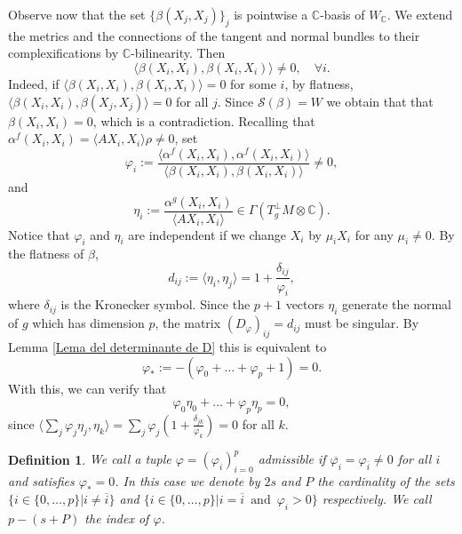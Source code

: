 \documentclass{article}
\newtheorem{defn}[thm]{Definition}
\theoremstyle{remark}
\begin{document}
Observe now that the set $\{\beta(X_j,X_j)\}_j$ is pointwise a $\mathbb{C}$-basis of $W_\mathbb{C}$. We extend the metrics and the connections of the tangent and normal bundles to their complexifications by $\mathbb{C}$-bilinearity. Then
\begin{equation*}\label{beta(i,i)neq 0}
    \langle\beta(X_i,X_i),\beta(X_i,X_i)\rangle \neq 0,\quad\forall i.
\end{equation*}
Indeed, if $\langle\beta(X_i,X_i),\beta(X_i,X_i)\rangle=0$ for some $i$, by flatness, $\langle\beta(X_i,X_i),\beta(X_j,X_j)\rangle=0$ for all $j$. Since $\mathcal{S}(\beta)=W$ we obtain that that $\beta(X_i,X_i)=0$, which is a contradiction.
Recalling that $\alpha^f(X_i,X_i)=\langle AX_i,X_i\rangle\rho\neq 0$, set
\begin{equation}\label{definion de tau_i}
    \varphi_i:=\frac{\langle\alpha^f(X_i,X_i),\alpha^f(X_i,X_i)\rangle}{\langle \beta(X_i,X_i),\beta(X_i,X_i)\rangle}\neq 0,
\end{equation}
and 
\begin{equation}\label{eta_i}
    \eta_i:=\frac{\alpha^g(X_i,X_i)}{\langle AX_i,X_i\rangle}\in\Gamma(T^\perp_g M\otimes\mathbb{C}).
\end{equation}
Notice that $\varphi_i$ and $\eta_i$ are independent if we change $X_i$ by $\mu_i X_i$ for any $\mu_i\neq 0$. By the flatness of $\beta$, 
\begin{equation}\label{d_ij definicion}
    d_{ij}:=\langle\eta_i,\eta_j\rangle=1+\frac{\delta_{ij}}{\varphi_i},
\end{equation}
where $\delta_{ij}$ is the Kronecker symbol. Since the $p+1$ vectors $\eta_i$ generate the normal of $g$ which has dimension $p$, the matrix $(D_\varphi)_{ij}=d_{ij}$ must be singular. By Lemma \ref{Lema del determinante de D} this is equivalent to 
\begin{equation}\label{suma=-1}
    \varphi_{*}:=-(\varphi_0+\ldots+\varphi_p+1)=0.
\end{equation}
With this, we can verify that
\begin{equation}\label{suma de varphi_i eta_i=0}
    \varphi_0\eta_0+\ldots+\varphi_p\eta_p=0,
\end{equation}
since $\langle\sum_j\varphi_j\eta_j,\eta_k\rangle=\sum_j\varphi_j(1+\frac{\delta_{jk}}{\varphi_k})=0$ for all $k$.
\begin{defn}\label{definicion de ser singular}
    \normalfont We call a tuple $\varphi=(\varphi_i)_{i=0}^p$ {\it admissible} if $\overline{\varphi_i}=\varphi_{\overline{i}}\neq 0$ for all $i$ and satisfies $\varphi_{*}=0$. In this case we denote by
    $2s$ and $P$ the cardinality of the sets $\{i\in\{0,\ldots,p\}|i\neq\overline{i}\}$ and $\{i\in\{0,\ldots,p\}|i=\overline{i}\,\text{ and }\,\varphi_i>0\}$ respectively. We call $p-(s+P)$ the {\it index} of $\varphi$.
\end{defn}
\end{document}
